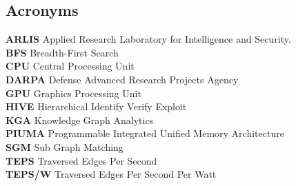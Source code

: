 \documentclass[letterpaper, 10pt]{article}
\begin{document}
\begin{multicols}{2}
{    \section{Acronyms}
        \small{
        \textbf{ARLIS} Applied Research Laboratory for Intelligence and Security.\\ 
        \textbf{BFS} Breadth-First Search \\
        \textbf{CPU} Central Processing Unit \\
        \textbf{DARPA} Defense Advanced Research Projects Agency \\ 
        \textbf{GPU} Graphics Processing Unit \\
        \textbf{HIVE} Hierarchical Identify Verify Exploit \\
        \textbf{KGA} Knowledge Graph Analytics \\
        \textbf{PIUMA} Programmable Integrated Unified Memory Architecture \\ 
        \textbf{SGM} Sub Graph Matching \\
        \textbf{TEPS} Traversed Edges Per Second \\
        \textbf{TEPS/W} Traversed Edges Per Second Per Watt
        }
    }
    \end{multicols}
    \newpage
\end{document}
